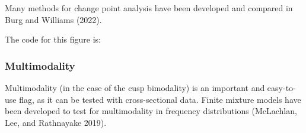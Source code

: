 \documentclass[
  a4paper,
  DIV=11,
  numbers=noendperiod,
  oneside]{scrreprt}
\newenvironment{Shaded}{}{}
\newcommand{\AttributeTok}[1]{\textcolor[rgb]{0.84,0.23,0.29}{#1}}
\newcommand{\CommentTok}[1]{\textcolor[rgb]{0.42,0.45,0.49}{#1}}
\newcommand{\DecValTok}[1]{\textcolor[rgb]{0.00,0.36,0.77}{#1}}
\newcommand{\FunctionTok}[1]{\textcolor[rgb]{0.44,0.26,0.76}{#1}}
\newcommand{\NormalTok}[1]{\textcolor[rgb]{0.14,0.16,0.18}{#1}}
\newcommand{\OtherTok}[1]{\textcolor[rgb]{0.44,0.26,0.76}{#1}}
\newcommand{\SpecialCharTok}[1]{\textcolor[rgb]{0.00,0.36,0.77}{#1}}
\newcommand{\StringTok}[1]{\textcolor[rgb]{0.01,0.18,0.38}{#1}}
\begin{document}
Many methods for change point analysis have been developed and compared
in Burg and Williams (2022).

The code for this figure is:

\begin{Shaded}
\end{Shaded}

\subsubsection{Multimodality}\label{sec-Multimodality}

Multimodality (in the case of the cusp bimodality) is an important and
easy-to-use flag, as it can be tested with cross-sectional data. Finite
mixture models have been developed to test for multimodality in
frequency distributions (McLachlan, Lee, and Rathnayake 2019).
\end{document}
